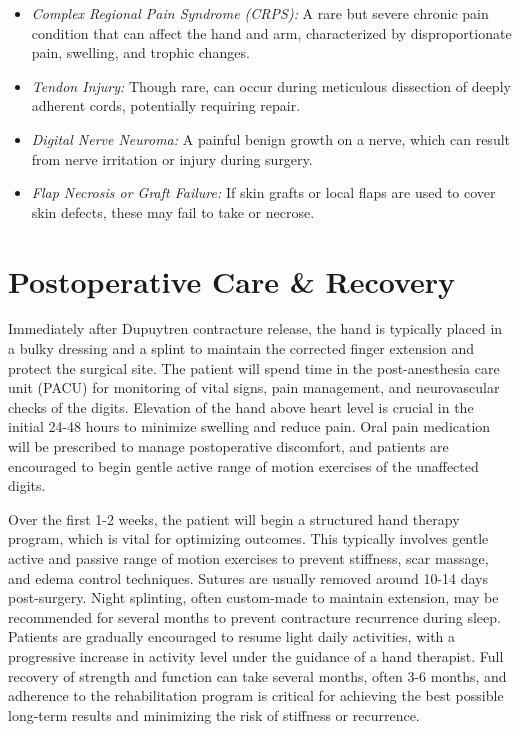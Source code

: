 \begin{itemize}
\begin{itemize}
    \item \textit{Complex Regional Pain Syndrome (CRPS):} A rare but severe chronic pain condition that can affect the hand and arm, characterized by disproportionate pain, swelling, and trophic changes.
    \item \textit{Tendon Injury:} Though rare, can occur during meticulous dissection of deeply adherent cords, potentially requiring repair.
    \item \textit{Digital Nerve Neuroma:} A painful benign growth on a nerve, which can result from nerve irritation or injury during surgery.
    \item \textit{Flap Necrosis or Graft Failure:} If skin grafts or local flaps are used to cover skin defects, these may fail to take or necrose.
  \end{itemize}
\end{itemize}

\section*{Postoperative Care \& Recovery}
Immediately after Dupuytren contracture release, the hand is typically placed in a bulky dressing and a splint to maintain the corrected finger extension and protect the surgical site. The patient will spend time in the post-anesthesia care unit (PACU) for monitoring of vital signs, pain management, and neurovascular checks of the digits. Elevation of the hand above heart level is crucial in the initial 24-48 hours to minimize swelling and reduce pain. Oral pain medication will be prescribed to manage postoperative discomfort, and patients are encouraged to begin gentle active range of motion exercises of the unaffected digits.

Over the first 1-2 weeks, the patient will begin a structured hand therapy program, which is vital for optimizing outcomes. This typically involves gentle active and passive range of motion exercises to prevent stiffness, scar massage, and edema control techniques. Sutures are usually removed around 10-14 days post-surgery. Night splinting, often custom-made to maintain extension, may be recommended for several months to prevent contracture recurrence during sleep. Patients are gradually encouraged to resume light daily activities, with a progressive increase in activity level under the guidance of a hand therapist. Full recovery of strength and function can take several months, often 3-6 months, and adherence to the rehabilitation program is critical for achieving the best possible long-term results and minimizing the risk of stiffness or recurrence.

